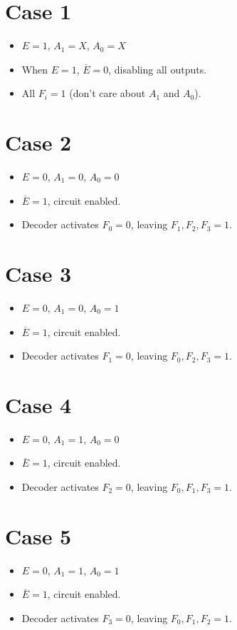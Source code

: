 \documentclass[10pt,answers]{exam}
\begin{document}
\begin{questions}
\begin{enumerate}[label=\alph*)]
\begin{solution}
\begin{center}
\begin{tabular}{|c|c|c|c|c|c|c|c|}
        \end{tabular}

		\section*{Case 1}
\begin{itemize}
    \item $E = 1$, $A_1 = X$, $A_0 = X$
    \item When $E = 1$, $\overline{E} = 0$, disabling all outputs.
    \item All $F_i = 1$ (don’t care about $A_1$ and $A_0$).
\end{itemize}

\section*{Case 2}
\begin{itemize}
    \item $E = 0$, $A_1 = 0$, $A_0 = 0$
    \item $\overline{E} = 1$, circuit enabled.
    \item Decoder activates $F_0 = 0$, leaving $F_1, F_2, F_3 = 1$.
\end{itemize}

\section*{Case 3}
\begin{itemize}
    \item $E = 0$, $A_1 = 0$, $A_0 = 1$
    \item $\overline{E} = 1$, circuit enabled.
    \item Decoder activates $F_1 = 0$, leaving $F_0, F_2, F_3 = 1$.
\end{itemize}

\section*{Case 4}
\begin{itemize}
    \item $E = 0$, $A_1 = 1$, $A_0 = 0$
    \item $\overline{E} = 1$, circuit enabled.
    \item Decoder activates $F_2 = 0$, leaving $F_0, F_1, F_3 = 1$.
\end{itemize}

\section*{Case 5}
\begin{itemize}
    \item $E = 0$, $A_1 = 1$, $A_0 = 1$
    \item $\overline{E} = 1$, circuit enabled.
    \item Decoder activates $F_3 = 0$, leaving $F_0, F_1, F_2 = 1$.
\end{itemize}
    \end{center}
\end{solution}


\end{enumerate}
\end{questions}
\end{document}
